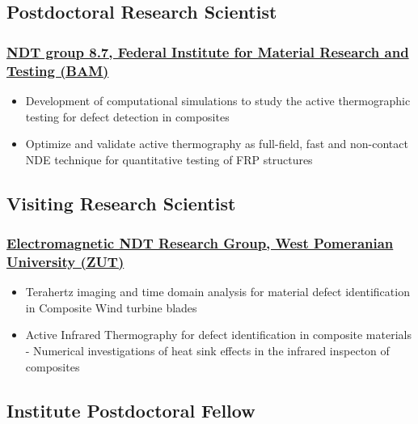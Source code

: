 \documentclass{my_cv}%
\begin{document}
\subsection{Postdoctoral Research Scientist}
\subsubsection{\href{https://www.bam.de/Navigation/DE/Home/home.html}{NDT group 8.7, Federal Institute for Material Research and Testing (BAM)}}
\begin{itemize}[leftmargin=0.15in]
\setlength\itemsep{-0.1em}
\color{mygray}
\item Development of computational simulations to study the active thermographic testing for defect detection in composites
\item Optimize and validate active thermography as full-field, fast and non-contact NDE technique for quantitative testing of FRP structures
\end{itemize}
{\color{mygray1} \hdashrule[0.1ex]{18.8cm}{0.2mm}{1mm}}
\subsection{Visiting Research Scientist}
\subsubsection{\href{https://innowacje.zut.edu.pl/cooperationoffer/electromagnetic-methods-non-destructive-testing}{Electromagnetic NDT Research Group, West Pomeranian University (ZUT)}}
\begin{itemize}[leftmargin=0.15in]
\setlength\itemsep{-0.1em}
\color{mygray}
\item Terahertz imaging and time domain analysis for material defect identification in Composite Wind turbine blades
\item Active Infrared Thermography for defect identification in composite materials - Numerical investigations of heat sink effects in the infrared inspecton of composites
\end{itemize}
{\color{mygray1} \hdashrule[0.1ex]{18.8cm}{0.2mm}{1mm}}
\subsection{Institute Postdoctoral Fellow}
\end{document}
